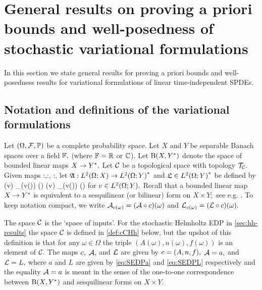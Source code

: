 \section[General stochastic a priori bounds and well-posedness]{General results on proving a priori bounds and well-posedness of stochastic variational formulations}\label{sec:gen-framework}\label{sec:general}
In this section we state general results for proving a priori bounds and well-posedness results for variational formulations of linear time-independent SPDEs.

\subsection{Notation and definitions of the variational formulations}\label{sec:notdef}
Let $\OFP$ be a complete probability space. Let $X$ and $Y$ be separable Banach spaces over a field $\mathbb F,$ (where $\mathbb F = \mathbb R$ or $\mathbb C$).
Let $\homspace$ denote the space of bounded linear maps $X\rightarrow Y^{*}.$ Let $\mathcal C$ be a topological space with topology $\mathcal T_{\mathcal C}.$ Given maps
\beqs
\coeff:\Omega\rightarrow\cC,\quad\toform:\cC \rightarrow \homspace,\quad{} \rhs:\cC \rightarrow \Ys,
\eeqs let $\SAc:\LtOX \rightarrow \LtOYas$ and  $\SLc \in \LtOYas$ be defined by
\beq\label{eq:SA}
(v) \de \int_\Omega {}\big(v(\omega)\big) \dd\PP(\omega) \quad{} \quad 
\SLc(v) \de \int_\Omega \Lcomega\big(v(\omega)\big) \dd \PP(\omega)
\eeq
for $v \in \LtOY.$ Recall that a bounded linear map $X\rightarrow Y^{*}$ is equivalent to a sesquilinear (or bilinear) form on $X \times Y;$ see e.g. \cite[Lemma 2.1.38]{SaSc:11}. To keep notation compact, we write $\Acomega=(\toform \circ c)(\omega)$ and $\Lcomega=(\rhs\circ c)(\omega).$



The space $\mathcal C$ is the `space of inputs'. For the stochastic Helmholtz EDP in \cref{sec:hh-results} the space $\mathcal C$ is defined in \cref{def:cCHh} below, but the upshot of this definition is that for any $\omega \in \Omega$ the triple $(A(\omega),n(\omega),f(\omega))$ is an element of $\mathcal C.$
The maps $c,$ $\mathcal A,$ and $\mathcal L$ are given by $\coeff = \mleft(A,n,f\mright),$ $\mathcal A = a,$ and $\mathcal L = L,$ where $a$ and $L$ are given by \eqref{eq:SEDPa} and \eqref{eq:SEDPL} respectively and the equality $\mathcal A=a$ is meant in the sense of the one-to-one correspondence between $\homspace$ and sesquilinear forms on $X\times Y.$
\ere

